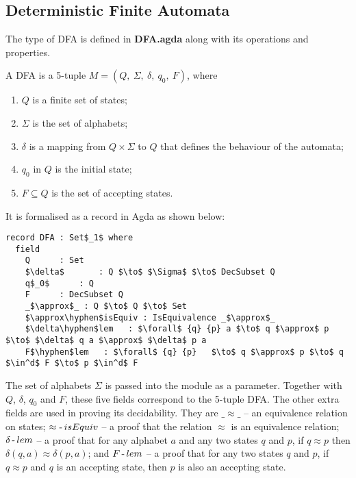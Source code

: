 \subsection{Deterministic Finite Automata}
\par The type of DFA is defined in \textbf{DFA.agda} along with its
operations and properties. 

\begin{defn}
\noindent A DFA is a 5-tuple \(M = (Q
,\ \Sigma,\ \delta,\ q_0,\ F)\), where
\begin{enumerate}[nolistsep]
  \item \(Q\) is a finite set of states;
  \item \(\Sigma\) is the set of alphabets;
  \item \(\delta\) is a mapping from \(Q \times \Sigma\) to \(Q\) that defines the behaviour of the automata;
  \item \(q_0\) in \(Q\) is the initial state;
  \item \(F \subseteq Q\) is the set of accepting states. 
\end{enumerate}
\end{defn}

\par It is formalised as a record in Agda as shown below: 

\begin{lstlisting}[mathescape=true,xleftmargin=.3\textwidth]
record DFA : Set$_1$ where
  field
    Q      : Set
    $\delta$       : Q $\to$ $\Sigma$ $\to$ DecSubset Q
    q$_0$      : Q
    F      : DecSubset Q
    _$\approx$_ : Q $\to$ Q $\to$ Set
    $\approx\hyphen$isEquiv : IsEquivalence _$\approx$_
    $\delta\hyphen$lem   : $\forall$ {q} {p} a $\to$ q $\approx$ p $\to$ $\delta$ q a $\approx$ $\delta$ p a
    F$\hyphen$lem   : $\forall$ {q} {p}   $\to$ q $\approx$ p $\to$ q $\in^d$ F $\to$ p $\in^d$ F
\end{lstlisting}

\par The set of alphabets \(\Sigma\) is passed into the module as a
parameter. Together with \(Q\), \(\delta\),
\(q_0\) and \(F\), these five fields correspond to the 5-tuple
DFA. The other extra fields are used in proving its decidability. They
are \(\_\approx\_\) -- an equivalence relation on states;
\(\approx\operatorname{-} isEquiv\) -- a proof that the relation \(\approx\) is
an equivalence relation; \(\delta\operatorname{-} lem\) -- a proof that for any
alphabet \(a\) and any two states \(q\) and \(p\), if \(q \approx p\)
then \(\delta (q,a) \approx \delta (p,a)\); and \(F\operatorname{-} lem\) -- a
proof that for any two states \(q\) and \(p\), if \(q \approx p\) and
\(q\) is an accepting state, then \(p\) is also an accepting state. 

